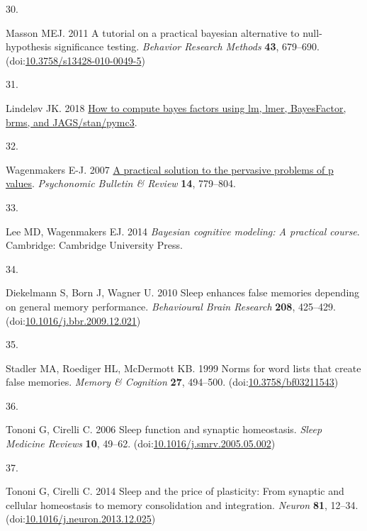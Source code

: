 \documentclass[
]{article}
\newlength{\cslhangindent}
\newlength{\csllabelwidth}
\newlength{\cslentryspacingunit} %
\newenvironment{CSLReferences}[2] %
 {%
  \setlength{\parindent}{0pt}
  \ifodd #1
  \let\oldpar\par
  \def\par{\hangindent=\cslhangindent\oldpar}
  \fi
  \setlength{\parskip}{#2\cslentryspacingunit}
 }%
 {}
\newcommand{\CSLLeftMargin}[1]{\parbox[t]{\csllabelwidth}{#1}}
\newcommand{\CSLRightInline}[1]{\parbox[t]{\linewidth - \csllabelwidth}{#1}\break}
\begin{document}
\begin{CSLReferences}{0}{0}
\leavevmode{}%
\CSLLeftMargin{30. }%
\CSLRightInline{Masson MEJ. 2011 A tutorial on a practical bayesian alternative to null-hypothesis significance testing. \emph{Behavior Research Methods} \textbf{43}, 679--690. (doi:\href{https://doi.org/10.3758/s13428-010-0049-5}{10.3758/s13428-010-0049-5})}

\leavevmode{}%
\CSLLeftMargin{31. }%
\CSLRightInline{Lindeløv JK. 2018 \href{https://rpubs.com/lindeloev/358672}{How to compute bayes factors using lm, lmer, BayesFactor, brms, and JAGS/stan/pymc3}. }

\leavevmode{}%
\CSLLeftMargin{32. }%
\CSLRightInline{Wagenmakers E-J. 2007 \href{http://dx.doi}{A practical solution to the pervasive problems of p values}. \emph{Psychonomic Bulletin \& Review} \textbf{14}, 779--804.}

\leavevmode{}%
\CSLLeftMargin{33. }%
\CSLRightInline{Lee MD, Wagenmakers EJ. 2014 \emph{Bayesian cognitive modeling: A practical course}. Cambridge: Cambridge University Press. }

\leavevmode{}%
\CSLLeftMargin{34. }%
\CSLRightInline{Diekelmann S, Born J, Wagner U. 2010 Sleep enhances false memories depending on general memory performance. \emph{Behavioural Brain Research} \textbf{208}, 425--429. (doi:\href{https://doi.org/10.1016/j.bbr.2009.12.021}{10.1016/j.bbr.2009.12.021})}

\leavevmode{}%
\CSLLeftMargin{35. }%
\CSLRightInline{Stadler MA, Roediger HL, McDermott KB. 1999 Norms for word lists that create false memories. \emph{Memory \& Cognition} \textbf{27}, 494--500. (doi:\href{https://doi.org/10.3758/bf03211543}{10.3758/bf03211543})}

\leavevmode{}%
\CSLLeftMargin{36. }%
\CSLRightInline{Tononi G, Cirelli C. 2006 Sleep function and synaptic homeostasis. \emph{Sleep Medicine Reviews} \textbf{10}, 49--62. (doi:\href{https://doi.org/10.1016/j.smrv.2005.05.002}{10.1016/j.smrv.2005.05.002})}

\leavevmode{}%
\CSLLeftMargin{37. }%
\CSLRightInline{Tononi G, Cirelli C. 2014 Sleep and the price of plasticity: From synaptic and cellular homeostasis to memory consolidation and integration. \emph{Neuron} \textbf{81}, 12--34. (doi:\href{https://doi.org/10.1016/j.neuron.2013.12.025}{10.1016/j.neuron.2013.12.025})}

\end{CSLReferences}
\end{document}
